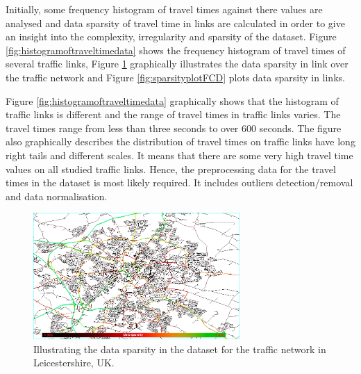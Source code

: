 \documentclass[journal]{IEEEtran}
\begin{document}
Initially, some frequency histogram of travel times against there values are analysed and data sparsity of travel time in links are calculated in order to give an insight into the complexity, irregularity and sparsity of the dataset. Figure \ref{fig:histogramoftraveltimedata} shows the frequency histogram of travel times of several traffic links, Figure \ref{fig:visualsparsity} graphically illustrates the data sparsity in link over the traffic network and Figure \ref{fig:sparsityplotFCD} plots data sparsity in links. 

Figure \ref{fig:histogramoftraveltimedata} graphically shows that the histogram of traffic links is different and the range of travel times in traffic links varies. The travel times range from less than three seconds to over 600 seconds. The figure also graphically describes the distribution of travel times on traffic links have long right tails and different scales. It means that there are some very high travel time values on all studied traffic links. Hence, the preprocessing data for the travel times in the dataset is most likely required. It includes outliers detection/removal and data normalisation.

\begin{figure}[!t]
\centering
\includegraphics[width=0.7\textwidth]{DataSparsityColorScale}
\caption{Illustrating the data sparsity in the dataset for the traffic network in Leicestershire, UK.}
\label{fig:visualsparsity}
\end{figure}
\end{document}
